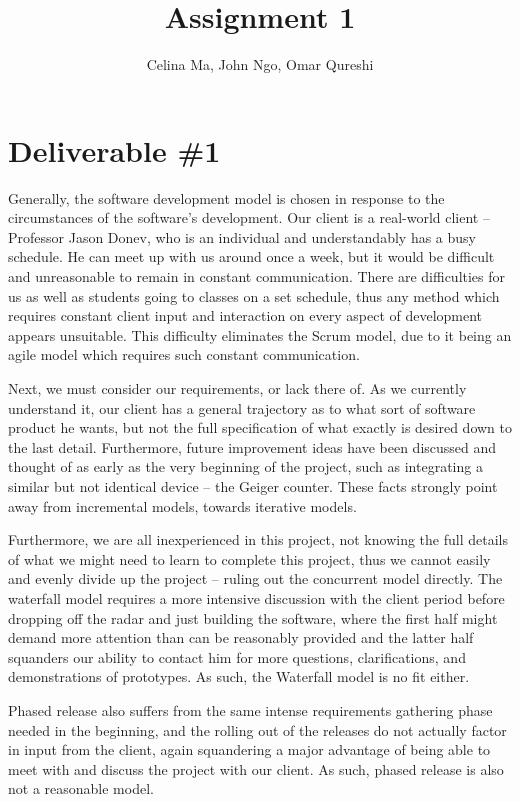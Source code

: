 \documentclass[11pt,a4paper]{article}
\title{\vspace{-2.0cm} Assignment 1}
\author{Celina Ma, John Ngo, Omar Qureshi}
\begin{document}
\maketitle
\def\textfraction{.01}
\def\topfraction{.99}
\section*{Deliverable \#1}

Generally, the software development model is chosen in response to the circumstances of the software’s development. Our client is a real-world client – Professor Jason Donev, who is an individual and understandably has a busy schedule. He can meet up with us around once a week, but it would be difficult and unreasonable to remain in constant communication. There are difficulties for us as well as students going to classes on a set schedule, thus any method which requires constant client input and interaction on every aspect of development appears unsuitable. This difficulty eliminates the Scrum model, due to it being an agile model which requires such constant communication.

Next, we must consider our requirements, or lack there of. As we currently understand it, our client has a general trajectory as to what sort of software product he wants, but not the full specification of what exactly is desired down to the last detail. Furthermore, future improvement ideas have been discussed and thought of as early as the very beginning of the project, such as integrating a similar but not identical device – the Geiger counter. These facts strongly point away from incremental models, towards iterative models. 

Furthermore, we are all inexperienced in this project, not knowing the full details of what we might need to learn to complete this project, thus we cannot easily and evenly divide up the project – ruling out the concurrent model directly. The waterfall model requires a more intensive discussion with the client period before dropping off the radar and just building the software, where the first half might demand more attention than can be reasonably provided and the latter half squanders our ability to contact him for more questions, clarifications, and demonstrations of prototypes. As such, the Waterfall model is no fit either.

Phased release also suffers from the same intense requirements gathering phase needed in the beginning, and the rolling out of the releases do not actually factor in input from the client, again squandering a major advantage of being able to meet with and discuss the project with our client. As such, phased release is also not a reasonable model.
\end{document}
